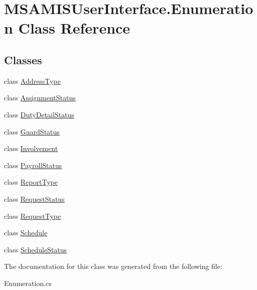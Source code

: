 \hypertarget{class_m_s_a_m_i_s_user_interface_1_1_enumeration}{}\section{M\+S\+A\+M\+I\+S\+User\+Interface.\+Enumeration Class Reference}
\label{class_m_s_a_m_i_s_user_interface_1_1_enumeration}
\subsection*{Classes}
\begin{DoxyCompactItemize}
\item 
class \hyperlink{class_m_s_a_m_i_s_user_interface_1_1_enumeration_1_1_address_type}{Address\+Type}
\item 
class \hyperlink{class_m_s_a_m_i_s_user_interface_1_1_enumeration_1_1_assignment_status}{Assignment\+Status}
\item 
class \hyperlink{class_m_s_a_m_i_s_user_interface_1_1_enumeration_1_1_duty_detail_status}{Duty\+Detail\+Status}
\item 
class \hyperlink{class_m_s_a_m_i_s_user_interface_1_1_enumeration_1_1_guard_status}{Guard\+Status}
\item 
class \hyperlink{class_m_s_a_m_i_s_user_interface_1_1_enumeration_1_1_involvement}{Involvement}
\item 
class \hyperlink{class_m_s_a_m_i_s_user_interface_1_1_enumeration_1_1_payroll_status}{Payroll\+Status}
\item 
class \hyperlink{class_m_s_a_m_i_s_user_interface_1_1_enumeration_1_1_report_type}{Report\+Type}
\item 
class \hyperlink{class_m_s_a_m_i_s_user_interface_1_1_enumeration_1_1_request_status}{Request\+Status}
\item 
class \hyperlink{class_m_s_a_m_i_s_user_interface_1_1_enumeration_1_1_request_type}{Request\+Type}
\item 
class \hyperlink{class_m_s_a_m_i_s_user_interface_1_1_enumeration_1_1_schedule}{Schedule}
\item 
class \hyperlink{class_m_s_a_m_i_s_user_interface_1_1_enumeration_1_1_schedule_status}{Schedule\+Status}
\end{DoxyCompactItemize}


The documentation for this class was generated from the following file\+:\begin{DoxyCompactItemize}
\item 
Enumeration.\+cs\end{DoxyCompactItemize}
